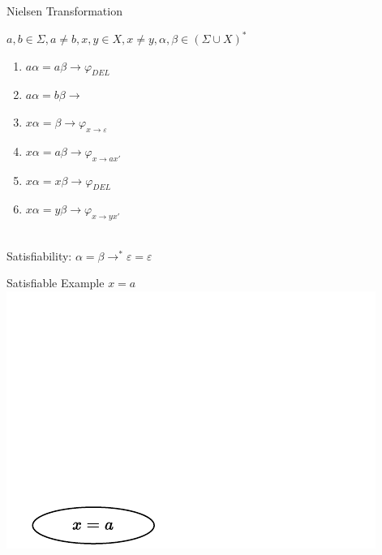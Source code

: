 \documentclass[xcolor=table]{beamer}
\newcommand{\xmark}{\ding{55}}%
\begin{document}
\begin{frame}{Nielsen Transformation}
\pause

$a, b \in \Sigma, a \neq b, x, y \in X, x \neq y, \alpha, \beta \in (\Sigma \cup X)^*$ \\

\begin{enumerate}
    \pause
    \item $a\alpha = a\beta \rightarrow \varphi_{DEL}$
    \pause
    \item $a\alpha = b\beta \rightarrow$ \xmark
    \pause
    \item $x\alpha = \beta \rightarrow \varphi_{x \rightarrow \varepsilon}$
    \pause
    \item $x\alpha = a\beta \rightarrow \varphi_{x \rightarrow ax'}$
    \pause
    \item $x\alpha = x\beta \rightarrow \varphi_{DEL}$
    \pause
    \item $x\alpha = y\beta \rightarrow \varphi_{x \rightarrow yx'}$
\end{enumerate}

\pause
~\\
Satisfiability: $\alpha = \beta \rightarrow^* \varepsilon = \varepsilon$
\end{frame}


\begin{frame}{Satisfiable Example $x = a$}
\includegraphics[]{images/x_a/x_a-1.pdf}
\end{frame}
\end{document}

